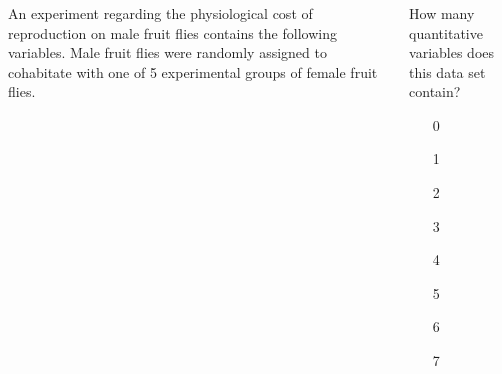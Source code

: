 \begin{frame}
\frametitle{\grp}
\begin{columns}
An experiment regarding the physiological cost of reproduction on male fruit flies contains the following variables. Male fruit flies were randomly assigned to cohabitate with one of 5 experimental groups of female fruit flies.  \\
\vskip10pt
\begin{clicker}{How many quantitative variables does this data set contain?}
\begin{enumerate}
    \item[0]
    \item[1]
    \item[2]
    \item[3]
    \item[4]
    \item[5]
    \item[6]
    \item[7]
\end{enumerate}
\end{clicker}
\end{columns}
\end{frame}


